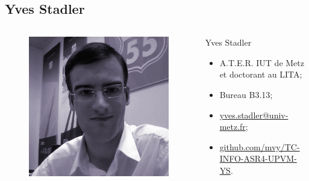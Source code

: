 \begin{frame}{\sectitle}
\def\subsectitle{Yves Stadler}
\subsection{\subsectitle}

\begin{columns}[c]

\begin{figure}
\includegraphics[width=\textwidth]{images/yves.png}
\end{figure}

\begin{block}{\subsectitle}
\begin{itemize}
\item A.T.E.R. IUT de Metz et doctorant au LITA;
\item Bureau B3.13;
\item \url{yves.stadler@univ-metz.fr};
\item \url{github.com/mvy/TC-INFO-ASR4-UPVM-YS}.
\end{itemize}
\end{block}

\end{columns}

\end{frame}

